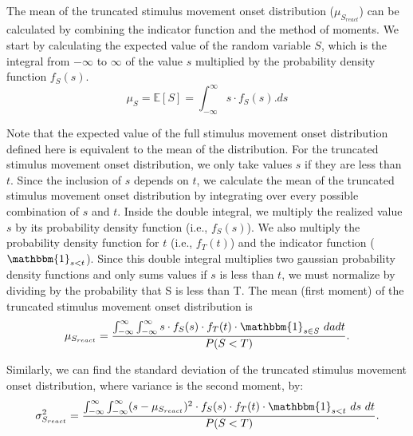 \documentclass[12pt]{article}
\begin{document}
The mean of the truncated stimulus movement onset distribution ($\mu_{S_{react}}$) can be calculated by combining the indicator function and the method of moments. We start by calculating the expected value of the random variable $S$, which is the integral from $-\infty$ to $\infty$ of the value $s$ multiplied by the probability density function $f_{S}(s)$.
\begin{equation}
    \mu_{S} = \mathbb{E}[S] = \int_{-\infty}^{\infty}s \cdot f_{S}(s).ds
\end{equation}

Note that the expected value of the full stimulus movement onset distribution defined here is equivalent to the mean of the distribution. For the truncated stimulus movement onset distribution, we only take values $s$ if they are less than $t$. Since the inclusion of $s$ depends on $t$, we calculate the mean of the truncated stimulus movement onset distribution by integrating over every possible combination of $s$ and $t$. Inside the double integral, we multiply the realized value $s$ by its probability density function (i.e., $f_{S}(s)$). We also multiply the probability density function for $t$ (i.e., $f_{T}(t)$) and the indicator function ($\mathbbm{1}_{s<t}$). Since this double integral multiplies two gaussian probability density functions and only sums values if $s$ is less than $t$, we must normalize by dividing by the probability that S is less than T. The mean (first moment) of the truncated stimulus movement onset distribution is
\begin{equation}
    \mu_{S_{react}} = \dfrac{\int_{-\infty}^{\infty}  \int_{-\infty}^{\infty} s \cdot f_{S}(s) \cdot f_{T}(t) \cdot \mathbbm{1}_{s \in S} \ dadt} {P(S<T)}.
\end{equation}

Similarly, we can find the standard deviation of the truncated stimulus movement onset distribution, where variance is the second moment, by:
%
\begin{equation}
    \sigma^2_{S_{react}} = \dfrac{\int_{-\infty}^{\infty}  \int_{-\infty}^{\infty} (s - \mu_{S_{react}})^2 \cdot f_{S}(s) \cdot f_{T}(t) \cdot \mathbbm{1}_{s<t} \ ds \ dt}{P(S<T)}.
\end{equation}
\end{document}
